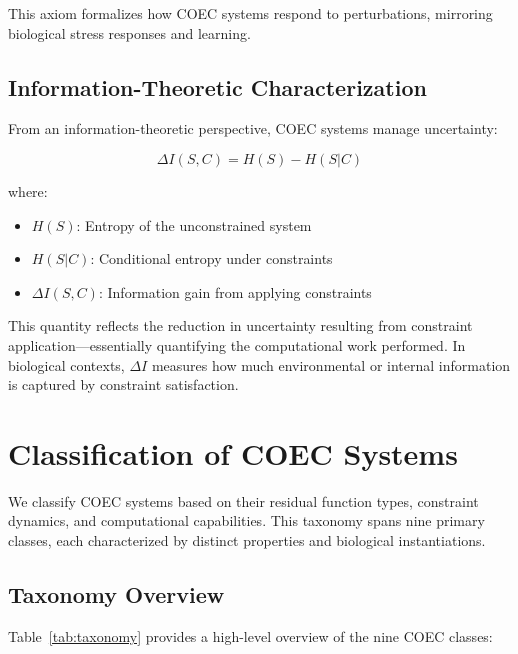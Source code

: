 \documentclass[11pt]{article}
\begin{document}
This axiom formalizes how COEC systems respond to perturbations, mirroring biological stress responses and learning.

\subsection{Information-Theoretic Characterization}

From an information-theoretic perspective, COEC systems manage uncertainty:

\begin{equation}
\Delta I(S, C) = H(S) - H(S|C)
\end{equation}

where:
\begin{itemize}
\item $H(S)$: Entropy of the unconstrained system
\item $H(S|C)$: Conditional entropy under constraints
\item $\Delta I(S, C)$: Information gain from applying constraints
\end{itemize}

This quantity reflects the reduction in uncertainty resulting from constraint application—essentially quantifying the computational work performed. In biological contexts, $\Delta I$ measures how much environmental or internal information is captured by constraint satisfaction.

\section{Classification of COEC Systems}
\label{sec:taxonomy}

We classify COEC systems based on their residual function types, constraint dynamics, and computational capabilities. This taxonomy spans nine primary classes, each characterized by distinct properties and biological instantiations.

\subsection{Taxonomy Overview}

Table~\ref{tab:taxonomy} provides a high-level overview of the nine COEC classes:
\end{document}
